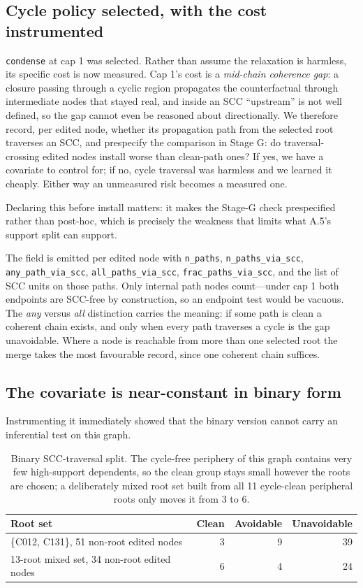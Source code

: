 \documentclass[11pt]{article}
\begin{document}
\subsection{Cycle policy selected, with the cost instrumented}

\texttt{condense} at cap 1 was selected. Rather than assume the relaxation is
harmless, its specific cost is now measured. Cap 1's cost is a \emph{mid-chain
coherence gap}: a closure passing through a cyclic region propagates the
counterfactual through intermediate nodes that stayed real, and inside an SCC
``upstream'' is not well defined, so the gap cannot even be reasoned about
directionally. We therefore record, per edited node, whether its propagation path
from the selected root traverses an SCC, and prespecify the comparison in Stage G:
do traversal-crossing edited nodes install worse than clean-path ones? If yes, we
have a covariate to control for; if no, cycle traversal was harmless and we
learned it cheaply. Either way an unmeasured risk becomes a measured one.

Declaring this before install matters: it makes the Stage-G check prespecified
rather than post-hoc, which is precisely the weakness that limits what A.5's
support split can support.

The field is emitted per edited node with \texttt{n\_paths},
\texttt{n\_paths\_via\_scc}, \texttt{any\_path\_via\_scc},
\texttt{all\_paths\_via\_scc}, \texttt{frac\_paths\_via\_scc}, and the list of
SCC units on those paths. Only internal path nodes count---under cap 1 both
endpoints are SCC-free by construction, so an endpoint test would be vacuous. The
\emph{any} versus \emph{all} distinction carries the meaning: if some path is
clean a coherent chain exists, and only when every path traverses a cycle is the
gap unavoidable. Where a node is reachable from more than one selected root the
merge takes the most favourable record, since one coherent chain suffices.

\subsection{The covariate is near-constant in binary form}

Instrumenting it immediately showed that the binary version cannot carry an
inferential test on this graph.

\begin{table}[h]
\centering
\begin{tabular}{lrrr}
\toprule
Root set & Clean & Avoidable & Unavoidable \\
\midrule
\{C012, C131\}, 51 non-root edited nodes & 3 & 9 & 39 \\
13-root mixed set, 34 non-root edited nodes & 6 & 4 & 24 \\
\bottomrule
\end{tabular}
\caption{Binary SCC-traversal split. The cycle-free periphery of this graph
contains very few high-support dependents, so the clean group stays small however
the roots are chosen; a deliberately mixed root set built from all 11 cycle-clean
peripheral roots only moves it from 3 to 6.}
\end{table}
\end{document}
